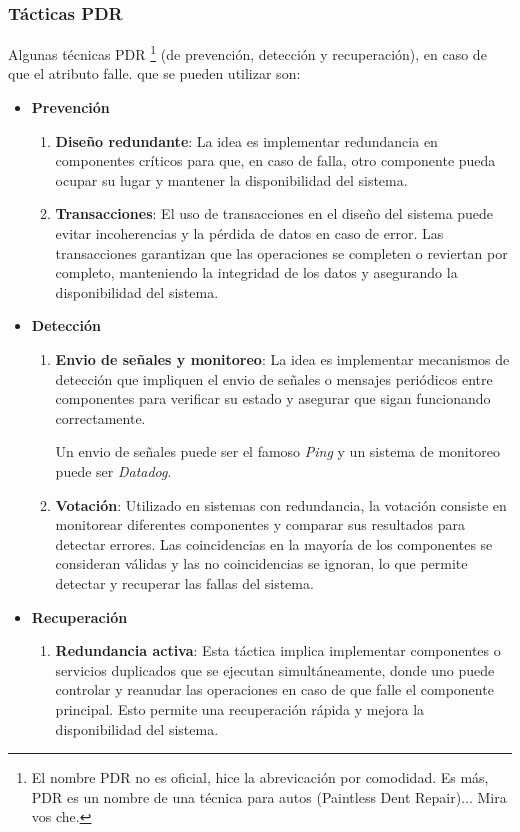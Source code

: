 \documentclass{article}
\begin{document}
		
		\subsubsection{Tácticas PDR}
			Algunas técnicas PDR \footnote{El nombre PDR no es oficial, hice la abrevicación por comodidad. Es más, PDR es un nombre de una técnica para autos (Paintless Dent Repair)... Mira vos che. } (de prevención, detección y recuperación), en caso de que el atributo falle. que se pueden utilizar son: 
			
			\begin{itemize}		
				\item \textbf{Prevención}
				\begin{enumerate}
					\item \textbf{Diseño redundante}: La idea es implementar redundancia en componentes críticos para que, en caso de falla, otro componente pueda ocupar su lugar y mantener la disponibilidad del sistema.
					
					\item \textbf{Transacciones}: El uso de transacciones en el diseño del sistema puede evitar incoherencias y la pérdida de datos en caso de error. Las transacciones garantizan que las operaciones se completen o reviertan por completo, manteniendo la integridad de los datos y asegurando la disponibilidad del sistema.
				\end{enumerate}
				\item \textbf{Detección}
				\begin{enumerate}
					\item \textbf{Envio de señales y monitoreo}: La idea es implementar mecanismos de detección que impliquen el envio de señales o mensajes periódicos entre componentes para verificar su estado y asegurar que sigan funcionando correctamente. 
				
					Un envio de señales puede ser el famoso \textit{Ping} y un sistema de monitoreo puede ser \textit{Datadog}.
					
					\item \textbf{Votación}: Utilizado en sistemas con redundancia, la votación consiste en monitorear diferentes componentes y comparar sus resultados para detectar errores. Las coincidencias en la mayoría de los componentes se consideran válidas y las no coincidencias se ignoran, lo que permite detectar y recuperar las fallas del sistema.
				\end{enumerate}
				
				\item \textbf{Recuperación}
				\begin{enumerate}
					\item \textbf{Redundancia activa}: Esta táctica implica implementar componentes o servicios duplicados que se ejecutan simultáneamente, donde uno puede controlar y reanudar las operaciones en caso de que falle el componente principal. Esto permite una recuperación rápida y mejora la disponibilidad del sistema.
					

\end{enumerate}
\end{itemize}
\end{document}
